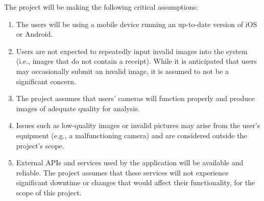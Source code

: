 \documentclass{article}
\begin{document}
The project will be making the following critical assumptions: 
\begin{enumerate}
    \item The users will be
    using a mobile device running an up-to-date version of iOS or Android.
    \item Users are
    not expected to repeatedly input invalid images into the system (i.e., images
    that do not contain a receipt). While it is anticipated that users may
    occasionally submit an invalid image, it is assumed to not be a significant
    concern.
    \item The project assumes that users' cameras will function properly and produce 
    images of adequate quality for analysis.
    \item Issues such as low-quality images or invalid pictures may arise from the 
    user's equipment (e.g., a malfunctioning camera) and are considered outside the 
    project's scope.
    \item External APIs and services used by the application will be available
    and reliable. The project assumes that these services will not experience
    significant downtime or changes that would affect their functionality, for
    the scope of this project.
\end{enumerate}  
\end{document}
